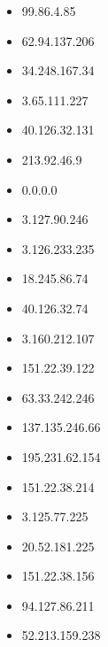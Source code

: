 \documentclass{article}
\begin{document}
\begin{itemize}
            \item 99.86.4.85
        
            \item 62.94.137.206
        
            \item 34.248.167.34
        
            \item 3.65.111.227
        
            \item 40.126.32.131
        
            \item 213.92.46.9
        
            \item 0.0.0.0
        
            \item 3.127.90.246
        
            \item 3.126.233.235
        
            \item 18.245.86.74
        
            \item 40.126.32.74
        
            \item 3.160.212.107
        
            \item 151.22.39.122
        
            \item 63.33.242.246
        
            \item 137.135.246.66
        
            \item 195.231.62.154
        
            \item 151.22.38.214
        
            \item 3.125.77.225
        
            \item 20.52.181.225
        
            \item 151.22.38.156
        
            \item 94.127.86.211
        
            \item 52.213.159.238
        

\end{itemize}
\end{document}
